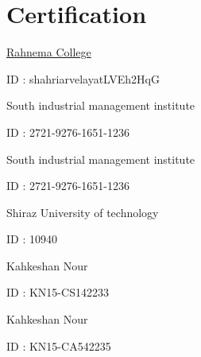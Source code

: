 \documentclass[]{plushcv}
\begin{document}
\begin{minipage}[t]{0.70\textwidth} 



\section{Certification}

{{\href{https://rahnemacollege.com/}{Rahnema College}}}
\vspace{\topsep}
\begin{tightemize}
\sectionsep
\item ID : shahriarvelayatLVEh2HqG
\end{tightemize}

\sectionsep
{}
{South industrial management institute}
\vspace{\topsep}
\begin{tightemize}
\item ID :  2721-9276-1651-1236
\end{tightemize}
\sectionsep

\sectionsep
{}
{South industrial management institute}
\vspace{\topsep}
\begin{tightemize}
\item ID :  2721-9276-1651-1236
\end{tightemize}
\sectionsep


\sectionsep
{}
{Shiraz University of technology}
\vspace{\topsep}
\begin{tightemize}
\item ID :  10940
\end{tightemize}
\sectionsep


\sectionsep
{}
{Kahkeshan  Nour}
\vspace{\topsep}
\begin{tightemize}
\item ID :  KN15-CS142233
\end{tightemize}
\sectionsep

\sectionsep
{}
{Kahkeshan  Nour}
\vspace{\topsep}
\begin{tightemize}
\item ID :  KN15-CA542235
\end{tightemize}
\sectionsep

\end{minipage} 
\end{document}
